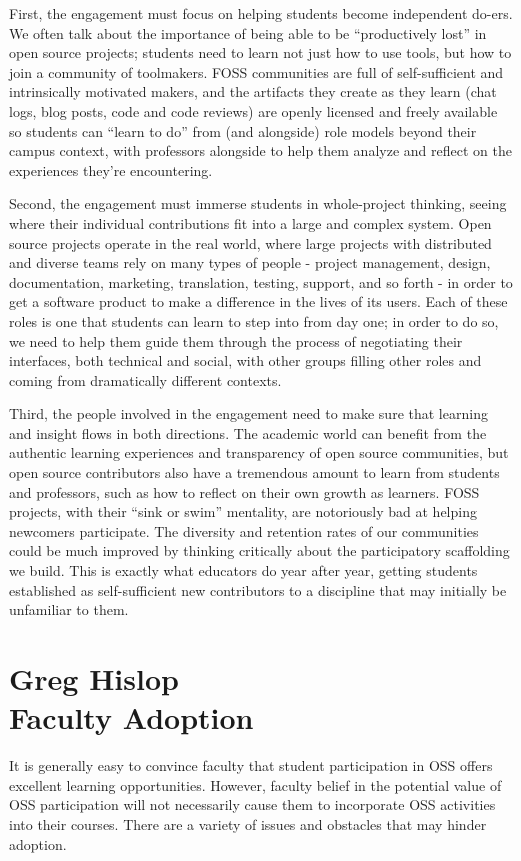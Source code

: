\documentclass{sig-alternate}
\begin{document}
First, the engagement must focus on helping students become independent do-ers. We often talk about the importance of being able to be ``productively lost'' in open source projects; students need to learn not just how to use tools, but how to join a community of toolmakers. FOSS communities are full of self-sufficient and intrinsically motivated makers, and the artifacts they create as they learn (chat logs, blog posts, code and code reviews) are openly licensed and freely available so students can ``learn to do'' from (and alongside) role models beyond their campus context, with professors alongside to help them analyze and reflect on the experiences they're encountering.

Second, the engagement must immerse students in whole-project thinking, seeing where their individual contributions fit into a large and complex system. Open source projects operate in the real world, where large projects with distributed and diverse teams rely on many types of people - project management, design, documentation, marketing, translation, testing, support, and so forth - in order to get a software product to make a difference in the lives of its users. Each of these roles is one that students can learn to step into from day one; in order to do so, we need to help them guide them through the process of negotiating their interfaces, both technical and social, with other groups filling other roles and coming from dramatically different contexts.

Third, the people involved in the engagement need to make sure that learning and insight flows in both directions. The academic world can benefit from the authentic learning experiences and transparency of open source communities, but open source contributors also have a tremendous amount to learn from students and professors, such as how to reflect on their own growth as learners. FOSS projects, with their ``sink or swim'' mentality, are notoriously bad at helping newcomers participate. The diversity and retention rates of our communities could be much improved by thinking critically about the participatory scaffolding we build.  This is exactly what educators do year after year, getting students established as self-sufficient new contributors to a discipline that may initially be unfamiliar to them.

\section{Greg Hislop\\Faculty Adoption}        
It is generally easy to convince faculty that student participation in OSS offers excellent learning opportunities.  However, faculty belief in the potential value of OSS participation will not necessarily cause them to incorporate OSS activities into their courses.  There are a variety of issues and obstacles that may hinder adoption.
\end{document}
